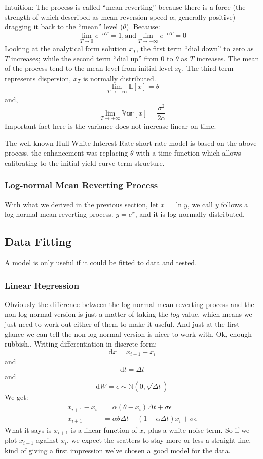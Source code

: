 \documentclass{article}
\begin{document}
Intuition: The process is called ``mean reverting'' because there is a
force (the strength of which described as mean reversion speed $\alpha$,
generally positive) dragging it back to the ``mean'' level ($\theta$).
Because:
\[\lim_{T \to 0} e^{-\alpha T} = 1 \mathrm{, and } \lim_{T \to +\infty} e^{-\alpha T}=0\]
Looking at the analytical form solution $x_T$, the first term ``dial
down'' to zero as $T$ increases; while the second term ``dial up'' from
$0$ to $\theta$ as $T$ increases. The mean of the process tend to the
mean level from initial level $x_0$. The third term represents
dispersion, $x_T$ is normally distributed.
\[\lim_{T \to +\infty} \mathbb{E}[x] = \theta\] and,
\[\lim_{T \to +\infty} \mathbb{Var}[x] = \frac{\sigma^2}{2\alpha}\]
Important fact here is the variance does not increase linear on time.

The well-known Hull-White Interest Rate short rate model is based on the
above process, the enhancement was replacing $\theta$ with a time
function which allows calibrating to the initial yield curve term
structure.


    \subsubsection{Log-normal Mean Reverting Process}


    With what we derived in the previous section, let $x=\ln{y}$, we call
$y$ follows a log-normal mean reverting process. $y=e^x$, and it is
log-normally distributed.


    \subsection{Data Fitting}


    A model is only useful if it could be fitted to data and tested.


    \subsubsection{Linear Regression}


    Obviously the difference between the log-normal mean reverting process
and the non-log-normal version is just a matter of taking the $log$
value, which means we just need to work out either of them to make it
useful. And just at the first glance we can tell the non-log-normal
version is nicer to work with. Ok, enough rubbish.. Writing
differentiation in discrete form:
\[\mathrm{d}x=x_{i+1}-x_i\]and\[\mathrm{d}t=\Delta t\]and\[\mathrm{d}W=\epsilon\sim\mathbb{N}(0,\sqrt{\Delta t})\]
We get: \[
\begin{equation}
\begin{split}
x_{i+1}-x_i & =\alpha (\theta-x_i) \Delta t + \sigma \epsilon \\
x_{i+1} & = \alpha \theta \Delta t + (1-\alpha\Delta t)x_i + \sigma\epsilon
\end{split}
\end{equation}
\] What it says is $x_{i+1}$ is a linear function of $x_i$ plus a white
noise term. So if we plot $x_{i+1}$ against $x_i$, we expect the
scatters to stay more or less a straight line, kind of giving a first
impression we've chosen a good model for the data.
\end{document}
